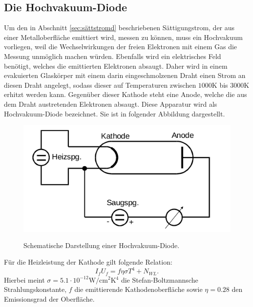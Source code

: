 \subsection{Die Hochvakuum-Diode}
\label{sec:hochvak}
Um den in Abschnitt \ref{sec:sättstromd} beschriebenen Sättigungstrom, der aus
einer Metalloberfläche emittiert wird, messen zu können, muss ein Hochvakuum
vorliegen, weil die Wechselwirkungen der freien Elektronen mit einem Gas die
Messung unmöglich machen würden. Ebenfalls wird ein elektrisches Feld benötigt,
welches die emittierten Elektronen absaugt. Daher wird in einem evakuierten
Glaskörper mit einem darin eingeschmolzenen Draht einen Strom an diesen Draht angelegt,
sodass dieser auf Temperaturen zwischen $1000 \si{\kelvin}$ bis $3000 \si{\kelvin}$
erhitzt werden kann. Gegenüber dieser Kathode steht eine Anode, welche die aus
dem Draht austretenden Elektronen absaugt. Diese Apparatur wird als
Hochvakuum-Diode bezeichnet. Sie ist in folgender Abbildung dargestellt.
\begin{figure}[H]
  \centering
  \includegraphics[scale=0.5]{content/hochvakuumdiode.png}
  \label{fig:hochvakuumd}
  \caption{Schematische Darstellung einer Hochvakuum-Diode. \cite{AP01}}
\end{figure}
\noindent
Für die Heizleistung der Kathode gilt folgende Relation:
\begin{equation}
  I_f U_f = f \eta \sigma T^4 + N_{WL}.
  \label{eqn:heizleistung}
\end{equation}
Hierbei meint $\sigma = 5.1 \cdot 10^{-12}\si{\watt\per\centi\meter\squared\kelvin^4}$
die Stefan-Boltzmannsche Strahlungskonstante, $f$ die emittierende Kathodenoberfläche
sowie $\eta = 0.28$ den Emissionsgrad der Oberfläche.

